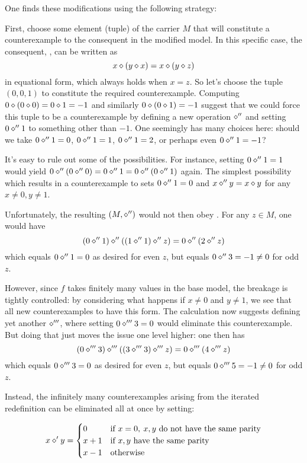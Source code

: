 One finds these modifications using the following strategy:

First, choose some element (tuple) of the carrier $M$ that will constitute a counterexample to the
consequent in the modified model. In this specific case, the consequent, , can be written as
$$ x \diamond (y \diamond x) = x \diamond (y \diamond z)$$
in equational form, which always holds when $x = z$. So let's choose the tuple $(0,0,1)$
to constitute the required counterexample. Computing $0 \diamond (0 \diamond 0) = 0 \diamond 1 = -1$ and similarly
$0 \diamond (0 \diamond 1) = -1$ suggest that we could force this tuple to be a counterexample by defining a new
operation $\diamond''$ and setting
$0 \diamond'' 1$ to something other than $-1$. One seemingly has many choices here: should we take
$0 \diamond'' 1 =0$, $0 \diamond'' 1 = 1$, $0 \diamond'' 1 = 2$, or perhaps even $0 \diamond'' 1 = -1$?

It's easy to rule out some of the possibilities. For instance, setting $0 \diamond'' 1 = 1$ would
yield $0 \diamond'' (0 \diamond'' 0) = 0 \diamond'' 1 = 0 \diamond'' (0 \diamond'' 1)$ again. The simplest possibility which results in
a counterexample to  sets $0 \diamond'' 1 = 0$ and $x \diamond'' y = x \diamond y$ for any $x \neq 0, y \neq 1$.

Unfortunately, the resulting $(M,\diamond'')$ would not then obey . For any $z \in M$, one would have
$$ (0 \diamond'' 1) \diamond'' ((1 \diamond'' 1) \diamond'' z) = 0 \diamond'' (2 \diamond'' z)$$
which equals $0 \diamond'' 1 = 0$ as desired for even $z$, but equals $0 \diamond'' 3 = -1 \neq 0$ for odd $z$.

However, since $f$ takes finitely many values in the base model, the breakage is tightly controlled:
by considering what happens if $x \neq 0$ and $y \neq 1$, we see that all new counterexamples to 
have this form. The calculation now suggests defining yet another $\diamond'''$, where setting
$0 \diamond''' 3 = 0$ would eliminate
this counterexample. But doing that just moves the issue one level higher: one then has
$$ (0 \diamond''' 3) \diamond''' ((3 \diamond''' 3) \diamond''' z) = 0 \diamond''' (4 \diamond''' z)$$ which equals $0 \diamond''' 3 = 0$ as desired for even $z$, but equals $0 \diamond''' 5 = -1 \neq 0$ for odd $z$.

Instead, the infinitely many counterexamples arising from the iterated redefinition can be eliminated
all at once by setting:

$$x \diamond' y = \begin{cases} 0 & \text{if } x=0,\: x,y \text{ do not have the same parity} \\  x+1 & \text{if } x,y \text{ have the same parity} \\ x -1 & \text{otherwise} \end{cases}$$

